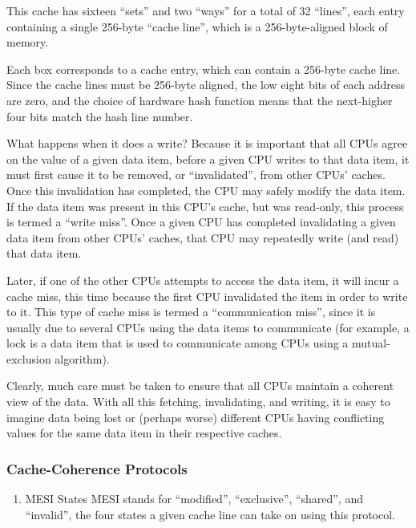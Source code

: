 \documentclass[11pt]{article}
\begin{document}
This cache has sixteen “sets” and two “ways” for a total of 32 “lines”, each entry containing a
single 256-byte “cache line”, which is a 256-byte-aligned block of memory.

Each box corresponds to a cache entry, which can contain a 256-byte cache line. Since the cache
lines must be 256-byte aligned, the low eight bits of each address are zero, and the choice of
hardware hash function means that the next-higher four bits match the hash line number.

What happens when it does a write? Because it is important that all CPUs agree on the value of a
given data item, before a given CPU writes to that data item, it must first cause it to be
removed, or “invalidated”, from other CPUs’ caches. Once this invalidation has completed, the
CPU may safely modify the data item. If the data item was present in this CPU’s cache, but was
read-only, this process is termed a “write miss”. Once a given CPU has completed invalidating a
given data item from other CPUs’ caches, that CPU may repeatedly write (and read) that data
item.

Later, if one of the other CPUs attempts to access the data item, it will incur a cache miss,
this time because the first CPU invalidated the item in order to write to it. This type of cache
miss is termed a “communication miss”, since it is usually due to several CPUs using the data
items to communicate (for example, a lock is a data item that is used to communicate among CPUs
using a mutual-exclusion algorithm).

Clearly, much care must be taken to ensure that all CPUs maintain a coherent view of the data.
With all this fetching, invalidating, and writing, it is easy to imagine data being lost or
(perhaps worse) different CPUs having conflicting values for the same data item in their
respective caches.
\subsubsection{Cache-Coherence Protocols}
\label{sec:org89f351f}
\begin{enumerate}
\item MESI States
\label{sec:orgccab1b7}
MESI stands for ``modified'', ``exclusive'', ``shared'', and ``invalid'', the four states a given cache
line can take on using this protocol.
\end{enumerate}
\end{document}
